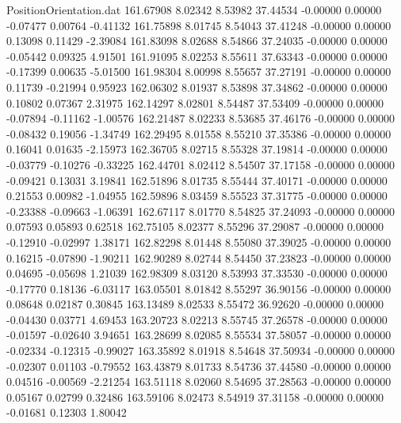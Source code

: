 \begin{filecontents}{PositionOrientation.dat}
 161.67908    8.02342    8.53982    37.44534   -0.00000    0.00000   -0.07477    0.00764   -0.41132
 161.75898    8.01745    8.54043    37.41248   -0.00000    0.00000    0.13098    0.11429   -2.39084
 161.83098    8.02688    8.54866    37.24035   -0.00000    0.00000   -0.05442    0.09325    4.91501
 161.91095    8.02253    8.55611    37.63343   -0.00000    0.00000   -0.17399    0.00635   -5.01500
 161.98304    8.00998    8.55657    37.27191   -0.00000    0.00000    0.11739   -0.21994    0.95923
 162.06302    8.01937    8.53898    37.34862   -0.00000    0.00000    0.10802    0.07367    2.31975
 162.14297    8.02801    8.54487    37.53409   -0.00000    0.00000   -0.07894   -0.11162   -1.00576
 162.21487    8.02233    8.53685    37.46176   -0.00000    0.00000   -0.08432    0.19056   -1.34749
 162.29495    8.01558    8.55210    37.35386   -0.00000    0.00000    0.16041    0.01635   -2.15973
 162.36705    8.02715    8.55328    37.19814   -0.00000    0.00000   -0.03779   -0.10276   -0.33225
 162.44701    8.02412    8.54507    37.17158   -0.00000    0.00000   -0.09421    0.13031    3.19841
 162.51896    8.01735    8.55444    37.40171   -0.00000    0.00000    0.21553    0.00982   -1.04955
 162.59896    8.03459    8.55523    37.31775   -0.00000    0.00000   -0.23388   -0.09663   -1.06391
 162.67117    8.01770    8.54825    37.24093   -0.00000    0.00000    0.07593    0.05893    0.62518
 162.75105    8.02377    8.55296    37.29087   -0.00000    0.00000   -0.12910   -0.02997    1.38171
 162.82298    8.01448    8.55080    37.39025   -0.00000    0.00000    0.16215   -0.07890   -1.90211
 162.90289    8.02744    8.54450    37.23823   -0.00000    0.00000    0.04695   -0.05698    1.21039
 162.98309    8.03120    8.53993    37.33530   -0.00000    0.00000   -0.17770    0.18136   -6.03117
 163.05501    8.01842    8.55297    36.90156   -0.00000    0.00000    0.08648    0.02187    0.30845
 163.13489    8.02533    8.55472    36.92620   -0.00000    0.00000   -0.04430    0.03771    4.69453
 163.20723    8.02213    8.55745    37.26578   -0.00000    0.00000   -0.01597   -0.02640    3.94651
 163.28699    8.02085    8.55534    37.58057   -0.00000    0.00000   -0.02334   -0.12315   -0.99027
 163.35892    8.01918    8.54648    37.50934   -0.00000    0.00000   -0.02307    0.01103   -0.79552
 163.43879    8.01733    8.54736    37.44580   -0.00000    0.00000    0.04516   -0.00569   -2.21254
 163.51118    8.02060    8.54695    37.28563   -0.00000    0.00000    0.05167    0.02799    0.32486
 163.59106    8.02473    8.54919    37.31158   -0.00000    0.00000   -0.01681    0.12303    1.80042

\end{filecontents}
